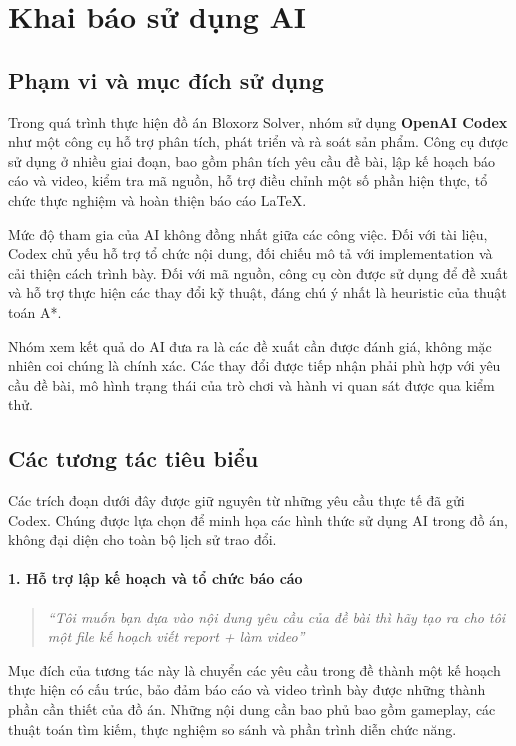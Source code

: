 \section{Khai báo sử dụng AI}

\subsection{Phạm vi và mục đích sử dụng}

Trong quá trình thực hiện đồ án Bloxorz Solver, nhóm sử dụng \textbf{OpenAI Codex} như một công cụ hỗ trợ phân tích, phát triển và rà soát sản phẩm. Công cụ được sử dụng ở nhiều giai đoạn, bao gồm phân tích yêu cầu đề bài, lập kế hoạch báo cáo và video, kiểm tra mã nguồn, hỗ trợ điều chỉnh một số phần hiện thực, tổ chức thực nghiệm và hoàn thiện báo cáo \LaTeX.

Mức độ tham gia của AI không đồng nhất giữa các công việc. Đối với tài liệu, Codex chủ yếu hỗ trợ tổ chức nội dung, đối chiếu mô tả với implementation và cải thiện cách trình bày. Đối với mã nguồn, công cụ còn được sử dụng để đề xuất và hỗ trợ thực hiện các thay đổi kỹ thuật, đáng chú ý nhất là heuristic của thuật toán A*.

Nhóm xem kết quả do AI đưa ra là các đề xuất cần được đánh giá, không mặc nhiên coi chúng là chính xác. Các thay đổi được tiếp nhận phải phù hợp với yêu cầu đề bài, mô hình trạng thái của trò chơi và hành vi quan sát được qua kiểm thử.

\subsection{Các tương tác tiêu biểu}

Các trích đoạn dưới đây được giữ nguyên từ những yêu cầu thực tế đã gửi Codex. Chúng được lựa chọn để minh họa các hình thức sử dụng AI trong đồ án, không đại diện cho toàn bộ lịch sử trao đổi.

\paragraph{1. Hỗ trợ lập kế hoạch và tổ chức báo cáo}
\begin{quote}
\textit{``Tôi muốn bạn dựa vào nội dung yêu cầu của đề bài thì hãy tạo ra cho tôi một file kế hoạch viết report + làm video''}
\end{quote}

Mục đích của tương tác này là chuyển các yêu cầu trong đề thành một kế hoạch thực hiện có cấu trúc, bảo đảm báo cáo và video trình bày được những thành phần cần thiết của đồ án. Những nội dung cần bao phủ bao gồm gameplay, các thuật toán tìm kiếm, thực nghiệm so sánh và phần trình diễn chức năng.

